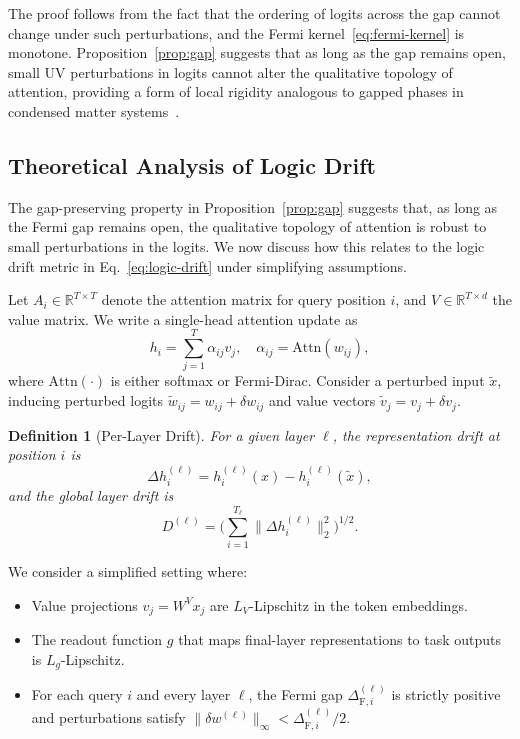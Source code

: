 \documentclass{article}
\newtheorem{definition}{Definition}
\newcommand{\fermigap}[1]{\Delta_{\text{F},#1}}
\begin{document}
\noindent
The proof follows from the fact that the ordering of logits across the gap cannot change under such perturbations, and the Fermi kernel~\eqref{eq:fermi-kernel} is monotone. Proposition~\ref{prop:gap} suggests that as long as the gap remains open, small UV perturbations in logits cannot alter the qualitative topology of attention, providing a form of local rigidity analogous to gapped phases in condensed matter systems~\cite{wen2004quantum}.

\subsection{Theoretical Analysis of Logic Drift}

The gap-preserving property in Proposition~\ref{prop:gap} suggests that, as long as the Fermi gap remains open, the qualitative topology of attention is robust to small perturbations in the logits. We now discuss how this relates to the logic drift metric in Eq.~\eqref{eq:logic-drift} under simplifying assumptions.

Let $A_i \in \mathbb{R}^{T \times T}$ denote the attention matrix for query position $i$, and $V \in \mathbb{R}^{T \times d}$ the value matrix. We write a single-head attention update as
\begin{equation}
    h_i = \sum_{j=1}^{T} \alpha_{ij} v_j,
    \quad
    \alpha_{ij} = \mathrm{Attn}(w_{ij}),
\end{equation}
where $\mathrm{Attn}(\cdot)$ is either softmax or Fermi-Dirac. Consider a perturbed input $\tilde{x}$, inducing perturbed logits $\tilde{w}_{ij} = w_{ij} + \delta w_{ij}$ and value vectors $\tilde{v}_j = v_j + \delta v_j$.

\begin{definition}[Per-Layer Drift]
For a given layer $\ell$, the representation drift at position $i$ is
\begin{equation}
    \Delta h_i^{(\ell)} = 
    h_i^{(\ell)}(x) - h_i^{(\ell)}(\tilde{x}),
\end{equation}
and the global layer drift is
\begin{equation}
    D^{(\ell)} = 
    \Big( \sum_{i=1}^{T_\ell} 
        \|\Delta h_i^{(\ell)}\|_2^2
    \Big)^{1/2}.
\end{equation}
\end{definition}

We consider a simplified setting where:
\begin{itemize}[leftmargin=*]
    \item[(A1)] Value projections $v_j = W^V x_j$ are $L_V$-Lipschitz in the token embeddings.
    \item[(A2)] The readout function $g$ that maps final-layer representations to task outputs is $L_g$-Lipschitz.
    \item[(A3)] For each query $i$ and every layer $\ell$, the Fermi gap $\fermigap{i}^{(\ell)}$ is strictly positive and perturbations satisfy $\|\delta w^{(\ell)}\|_\infty < \fermigap{i}^{(\ell)}/2$.
\end{itemize}
\end{document}
